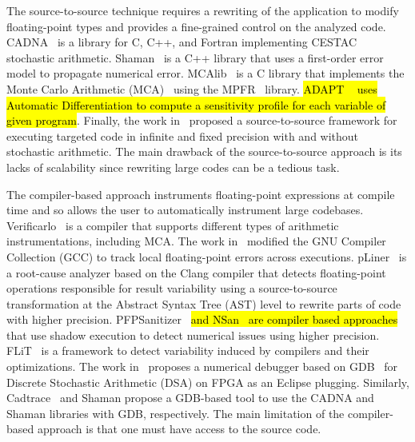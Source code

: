 \documentclass[10pt,journal,compsoc]{IEEEtran}
\DeclareRobustCommand{\add}[1]{\sethlcolor{lightgreen}\hl{#1}}
\begin{document}
The source-to-source technique requires a rewriting of the application to modify
floating-point types and provides a fine-grained control on the analyzed code.
CADNA~\cite{jezequel2008cadna} is a library for C, C++, and Fortran implementing
CESTAC~\cite{vignes1993stochastic} stochastic arithmetic.
Shaman~\cite{demeure_phd} is a C++ library that uses a first-order error model
to propagate numerical error. MCAlib~\cite{frechtling2015mcalib} is a C library
that implements the Monte Carlo Arithmetic (MCA)~\cite{parker1997monte} using
the MPFR~\cite{fousse2007mpfr} library. \add{ADAPT \mbox{~\cite{menon2018adapt}} uses
    Automatic Differentiation to compute a sensitivity profile for each variable of
    given program}. Finally, the work in~\cite{tang2016software} proposed a
source-to-source framework for executing targeted code in infinite and fixed
precision with and without stochastic arithmetic. The main drawback of the
source-to-source approach is its lacks of scalability since rewriting large
codes can be a tedious task.


The compiler-based approach instruments floating-point expressions at compile
time and so allows the user to automatically instrument large codebases.
Verificarlo~\cite{verificarlo} is a compiler that supports different types of
arithmetic instrumentations, including MCA. The work in~\cite{bao2013fly}
modified the GNU Compiler Collection (GCC) to track local floating-point errors
across executions. pLiner~\cite{guo2020pliner} is a root-cause analyzer based on
the Clang compiler that detects floating-point operations responsible for result
variability using a source-to-source transformation at the Abstract Syntax Tree
(AST) level to rewrite parts of code with higher precision.
PFPSanitizer~\cite{chowdhary2020debugging,chowdhary2021parallel} \add{and
    NSan~\mbox{\cite{courbet2021nsan}} are compiler based approaches}
that use shadow execution to detect numerical issues using higher
precision.
FLiT~\cite{sawaya2017flit} is a framework to detect variability
induced by compilers and their optimizations. The work
in~\cite{wang2012development} proposes a numerical debugger based on
GDB~\cite{stallman1988debugging} for Discrete Stochastic Arithmetic (DSA) on
FPGA as an Eclipse plugging. Similarly, Cadtrace~\cite{jezequel2008cadna} and
Shaman propose a GDB-based tool to use the CADNA and Shaman libraries with GDB,
respectively. The main limitation of the compiler-based approach is that one
must have access to the source code.
\end{document}

